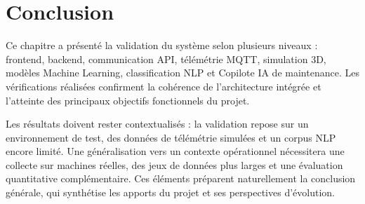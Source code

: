 \section{Conclusion}

Ce chapitre a présenté la validation du système selon plusieurs niveaux : frontend, backend, communication API, télémétrie MQTT, simulation 3D, modèles Machine Learning, classification NLP et Copilote IA de maintenance. Les vérifications réalisées confirment la cohérence de l'architecture intégrée et l'atteinte des principaux objectifs fonctionnels du projet.

Les résultats doivent rester contextualisés : la validation repose sur un environnement de test, des données de télémétrie simulées et un corpus NLP encore limité. Une généralisation vers un contexte opérationnel nécessitera une collecte sur machines réelles, des jeux de données plus larges et une évaluation quantitative complémentaire. Ces éléments préparent naturellement la conclusion générale, qui synthétise les apports du projet et ses perspectives d'évolution.
